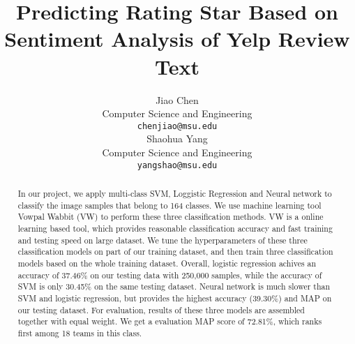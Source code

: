 \documentclass[11pt]{article}
\title{Predicting Rating Star Based on Sentiment Analysis of Yelp Review Text}
\author{Jiao Chen \\
  Computer Science and Engineering\\
  {\tt chenjiao@msu.edu} \\\And
  Shaohua Yang\\
  Computer Science and Engineering\\
  {\tt yangshao@msu.edu} \\}
\date{}
\begin{document}
\maketitle
\begin{abstract}
In our project, we apply multi-class SVM, Loggistic Regression and Neural network to classify the image samples that belong to 164 classes. We use machine learning tool Vowpal Wabbit (VW) to perform these three classification methods. VW is a online learning based tool, which provides reasonable classification accuracy and fast training and testing speed on large dataset. We tune the hyperparameters of these three classification models on part of our training dataset, and then train three classification models based on the whole training dataset. Overall, logistic regression achives an accuracy of 37.46\% on our testing data with 250,000 samples, while the accuracy of SVM is only 30.45\% on the same testing dataset. Neural network is much slower than SVM and logistic regression, but provides the highest accuracy (39.30\%) and MAP on our testing dataset. For evaluation, results of these three models are assembled together with equal weight. We get a evaluation MAP score of 72.81\%, which ranks first among 18 teams in this class.   
\end{abstract}


%
%
%


%



\clearpage
{\small


}
\end{document}
